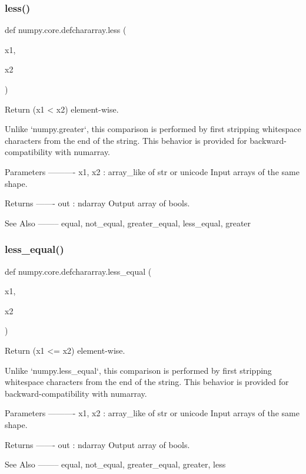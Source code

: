 \subsubsection{\texorpdfstring{less()}{less()}}
{\footnotesize\ttfamily def numpy.\+core.\+defchararray.\+less (\begin{DoxyParamCaption}\item[{}]{x1,  }\item[{}]{x2 }\end{DoxyParamCaption})}

\begin{DoxyVerb}Return (x1 < x2) element-wise.

Unlike `numpy.greater`, this comparison is performed by first
stripping whitespace characters from the end of the string.  This
behavior is provided for backward-compatibility with numarray.

Parameters
----------
x1, x2 : array_like of str or unicode
    Input arrays of the same shape.

Returns
-------
out : ndarray
    Output array of bools.

See Also
--------
equal, not_equal, greater_equal, less_equal, greater
\end{DoxyVerb}
 \mbox{\label{namespacenumpy_1_1core_1_1defchararray_a405f94ea7695dd678abcc64873cd0ddc}} 
\subsubsection{\texorpdfstring{less\+\_\+equal()}{less\_equal()}}
{\footnotesize\ttfamily def numpy.\+core.\+defchararray.\+less\+\_\+equal (\begin{DoxyParamCaption}\item[{}]{x1,  }\item[{}]{x2 }\end{DoxyParamCaption})}

\begin{DoxyVerb}Return (x1 <= x2) element-wise.

Unlike `numpy.less_equal`, this comparison is performed by first
stripping whitespace characters from the end of the string.  This
behavior is provided for backward-compatibility with numarray.

Parameters
----------
x1, x2 : array_like of str or unicode
    Input arrays of the same shape.

Returns
-------
out : ndarray
    Output array of bools.

See Also
--------
equal, not_equal, greater_equal, greater, less
\end{DoxyVerb}
 \mbox{\label{namespacenumpy_1_1core_1_1defchararray_a98145cf2cf6ec1292f52162139b69db8}} 
